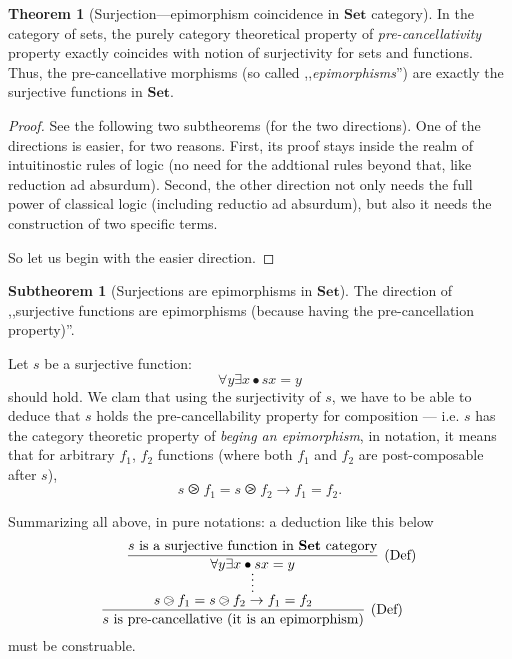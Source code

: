 \documentclass{article}
\newcommand{\setCat}{\mathbf{Set}}
\theoremstyle{definition}
\newtheorem{thm}{Theorem}
\newtheorem{sth}{Subtheorem}[thm]
\begin{document}
	\begin{thm}[Surjection---epimorphism coincidence in $\setCat$ category]
		In the category of sets, the purely category theoretical property of \emph{pre-cancellativity} property exactly coincides with notion of surjectivity for sets and functions.
		Thus, the pre-cancellative morphisms (so called ,,\emph{epimorphisms}'') are exactly the surjective functions in $\mathbf{Set}$.
	\end{thm}
	\begin{proof}
		See the following two subtheorems (for the two directions).
		One of the directions is easier, for two reasons. First, its proof stays inside the realm of intuitinostic rules of logic (no need for the addtional rules beyond that, like reduction ad absurdum). Second, the other direction not only needs the full power of classical logic (including reductio ad absurdum), but also it needs the construction of two specific terms.

		So let us begin with the easier direction.
	\end{proof}
	\begin{sth}[Surjections are epimorphisms in $\setCat$]
		The direction of ,,surjective functions are epimorphisms (because having the pre-cancellation property)''.

		Let $s$ be a surjective function:\[\forall y \exists x \bullet sx = y\]should hold.
		We clam that using the surjectivity of $s$, we have to be able to deduce that $s$ holds the pre-cancellability property for composition --- i.e. $s$ has the category theoretic property of \emph{beging an epimorphism}, in notation, it means that for arbitrary $f_1$, $f_2$ functions (where both $f_1$ and $f_2$ are post-composable after $s$),
		\[s\ogreaterthan f_1 = s\ogreaterthan f_2 \to f_1 = f_2.\]

		Summarizing all above, in pure notations: a deduction like this below
		\[
			\infer*{
				\infer[(\text{Def})]{
					\text{$s$ is pre-cancellative (it is an epimorphism)}
				}{
					s\ogreaterthan f_1 = s\ogreaterthan f_2 \to f_1 = f_2
				}
			}{
				\infer[(\text{Def})]{
					\forall y \exists x \bullet sx = y
				}{
					\text{$s$ is a surjective function in $\setCat$ category}
				}
			}
		\]
		must be construable.
	\end{sth}
\end{document}
